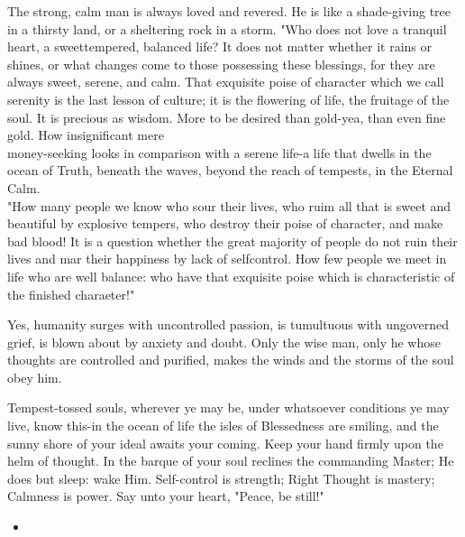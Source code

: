 \documentclass[10pt]{article}
\begin{document}
The strong, calm man is always loved and revered. He is like a shade-giving tree in a thirsty land, or a sheltering rock in a storm. "Who does not love a tranquil heart, a sweettempered, balanced life? It does not matter whether it rains or shines, or what changes come to those possessing these blessings, for they are always sweet, serene, and calm. That exquisite poise of character which we call serenity is the last lesson of culture; it is the flowering of life, the fruitage of the soul. It is precious as wisdom. More to be desired than gold-yea, than even fine gold. How insignificant mere\\
money-seeking looks in comparison with a serene life-a life that dwells in the ocean of Truth, beneath the waves, beyond the reach of tempests, in the Eternal Calm.\\
"How many people we know who sour their lives, who ruim all that is sweet and beautiful by explosive tempers, who destroy their poise of character, and make bad blood! It is a question whether the great majority of people do not ruin their lives and mar their happiness by lack of selfcontrol. How few people we meet in life who are well balance: who have that exquisite poise which is characteristic of the finished charaeter!"

Yes, humanity surges with uncontrolled passion, is tumultuous with ungoverned grief, is blown about by anxiety and doubt. Only the wise man, only he whose thoughts are controlled and purified, makes the winds and the storms of the soul obey him.

Tempest-tossed souls, wherever ye may be, under whatsoever conditions ye may live, know this-in the ocean of life the isles of Blessedness are smiling, and the sunny shore of your ideal awaits your coming. Keep your hand firmly upon the helm of thought. In the barque of your soul reclines the commanding Master; He does but sleep: wake Him. Self-control is strength; Right Thought is mastery; Calmness is power. Say unto your heart, "Peace, be still!"

\begin{itemize}
  \item 
\end{itemize}
\end{document}
